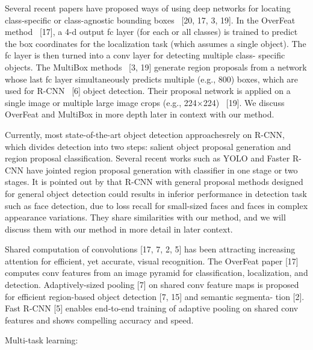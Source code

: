 Several recent papers have proposed ways of using deep networks for locating class-specific or class-agnostic bounding boxes~\cite{} [20, 17, 3, 19]. In the OverFeat method~\cite{} [17], a 4-d output fc layer (for each or all classes) is trained to predict the box coordinates for the localization task (which assumes a single object). The fc layer is then turned into a conv layer for detecting multiple class- specific objects. The MultiBox methods~\cite{} [3, 19] generate region proposals from a network whose last fc layer simultaneously predicts multiple (e.g., 800) boxes, which are used for R-CNN~\cite{} [6] object detection. Their proposal network is applied on a single image or multiple large image crops (e.g., 224×224)~\cite{} [19]. We discuss OverFeat and MultiBox in more depth later in context with our method.

Currently, most state-of-the-art object detection approaches\cite{ouyang2014deepid, li2015convolutional, erhan2014scalable,girshick2015fast}rely on R-CNN, which divides detection into two steps: salient object proposal generation and region proposal classification. Several recent works such as YOLO and Faster R-CNN have jointed region proposal generation with classifier in one stage or two stages. It is pointed out by \cite{farfade2015multi} that R-CNN with general proposal methods designed for general object detection could results in inferior performance in detection task such as face detection, due to loss recall for small-sized faces and faces in complex appearance variations. They share similarities with our method, and we will discuss them with our method in more detail in later context.  

Shared computation of convolutions [17, 7, 2, 5] has been attracting increasing attention for efficient, yet accurate, visual recognition. The OverFeat paper [17] computes conv features from an image pyramid for classification, localization, and detection. Adaptively-sized pooling [7] on shared conv feature maps is proposed for efficient region-based object detection [7, 15] and semantic segmenta- tion [2]. Fast R-CNN [5] enables end-to-end training of adaptive pooling on shared conv features and shows compelling accuracy and speed.

Multi-task learning:

